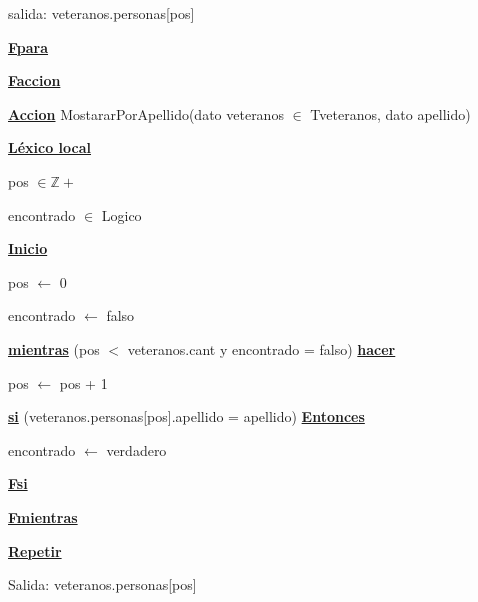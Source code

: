 \documentclass{article}
\begin{document}
                \hspace{16mm}salida: veteranos.personas[pos]

            \hspace{12mm}\underline{\textbf{Fpara}}

    \hspace{4mm}\underline{\textbf{Faccion}}

    \vspace{4mm}

    \hspace{4mm}\underline{\textbf{Accion}} MostararPorApellido(dato veteranos $\in$ Tveteranos, dato apellido)

        \hspace{8mm}\underline{\textbf{Léxico local}}

            \hspace{12mm}pos $\in \mathbb{Z}+$

            \hspace{12mm}encontrado $\in$ Logico

        \hspace{8mm}\underline{\textbf{Inicio}}

            \hspace{12mm} pos $\leftarrow$ 0

            \hspace{12mm} encontrado $\leftarrow$ falso

            \hspace{12mm}\underline{\textbf{mientras}} (pos $<$ veteranos.cant y encontrado = falso) \underline{\textbf{hacer}}

                \hspace{16mm}pos $\leftarrow$ pos + 1

                \hspace{16mm}\underline{\textbf{si}} (veteranos.personas[pos].apellido = apellido) \underline{\textbf{Entonces}}

                    \hspace{20mm}encontrado $\leftarrow$ verdadero

                \hspace{16mm}\underline{\textbf{Fsi}}

            \hspace{12mm}\underline{\textbf{Fmientras}}

            \hspace{12mm}\underline{\textbf{Repetir}}

                \hspace{16mm}Salida: veteranos.personas[pos]
\end{document}
